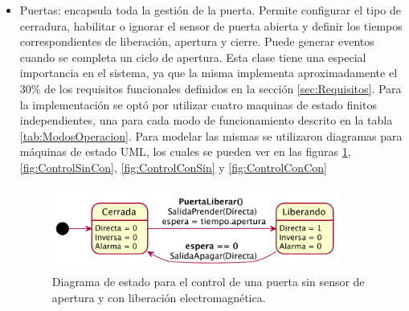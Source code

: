 \begin{itemize}
	\item Puertas: encapsula toda la gestión de la puerta. Permite configurar el tipo de cerradura, habilitar o ignorar el sensor de puerta abierta y definir los tiempos correspondientes de liberación, apertura y cierre. Puede generar eventos cuando se completa un ciclo de apertura. Esta clase tiene una especial importancia en el sistema, ya que la misma implementa aproximadamente el 30\% de los requisitos funcionales definidos en la sección \ref{sec:Requisitos}. Para la implementación se optó por utilizar cuatro maquinas de estado finitos independientes, una para cada modo de funcionamiento descrito en la tabla \ref{tab:ModosOperacion}. Para modelar las mismas se utilizaron diagramas para máquinas de estado UML\cite{noauthor_lenguaje_2020}\cite{noauthor_uml_2012}, los cuales se pueden ver en las figuras \ref{fig:ControlSinSin}, \ref{fig:ControlSinCon}, \ref{fig:ControlConSin} y \ref{fig:ControlConCon}

\begin{figure}[H]
	\centering
	\includegraphics[width=0.9\textwidth]{Figures/PNK-DE001.pdf}
	\caption[Diagrama de estados con cerradura electromagnética y sin sensor]{Diagrama de estado para el control de una puerta sin sensor de apertura y con liberación electromagnética.}
	\label{fig:ControlSinSin}
\end{figure}


\end{itemize}
